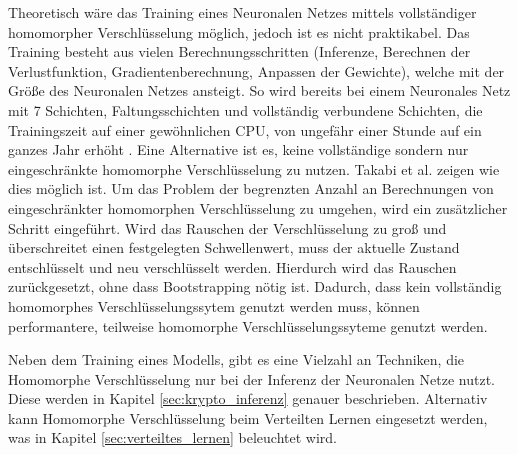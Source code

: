 Theoretisch wäre das Training eines Neuronalen Netzes mittels vollständiger homomorpher Verschlüsselung möglich, jedoch ist es nicht praktikabel. 
Das Training besteht aus vielen Berechnungsschritten (Inferenze, Berechnen der Verlustfunktion, Gradientenberechnung, Anpassen der Gewichte), welche mit der Größe des Neuronalen Netzes ansteigt.
So wird bereits bei einem Neuronales Netz mit 7 Schichten, Faltungsschichten und vollständig verbundene Schichten, die Trainingszeit auf einer gewöhnlichen CPU, von ungefähr einer Stunde auf ein ganzes Jahr erhöht \cite{P-103}.
Eine Alternative ist es, keine vollständige sondern nur eingeschränkte homomorphe Verschlüsselung zu nutzen.
Takabi et al. \cite{P-104} zeigen wie dies möglich ist.
Um das Problem der begrenzten Anzahl an Berechnungen von eingeschränkter homomorphen Verschlüsselung zu umgehen, wird ein zusätzlicher Schritt eingeführt. 
Wird das Rauschen der Verschlüsselung zu groß und überschreitet einen festgelegten Schwellenwert, muss der aktuelle Zustand entschlüsselt und neu verschlüsselt werden.
Hierdurch wird das Rauschen zurückgesetzt, ohne dass Bootstrapping nötig ist.
Dadurch, dass kein vollständig homomorphes Verschlüsselungssytem genutzt werden muss, können performantere, teilweise homomorphe Verschlüsselungssyteme genutzt werden.

Neben dem Training eines Modells, gibt es eine Vielzahl an Techniken, die Homomorphe Verschlüsselung nur bei der Inferenz der Neuronalen Netze nutzt. 
Diese werden in Kapitel \ref{sec:krypto_inferenz} genauer beschrieben.
Alternativ kann Homomorphe Verschlüsselung beim Verteilten Lernen eingesetzt werden, was in Kapitel \ref{sec:verteiltes_lernen} beleuchtet wird. 




